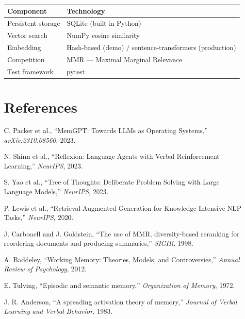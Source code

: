 \documentclass[a4paper,12pt]{article}
\begin{document}
\begin{table}[H]
\centering
\begin{tabular}{ll}
\toprule
\textbf{Component} & \textbf{Technology} \\
\midrule
Persistent storage & SQLite (built-in Python) \\
Vector search      & NumPy cosine similarity \\
Embedding          & Hash-based (demo) / sentence-transformers (production) \\
Competition        & MMR --- Maximal Marginal Relevance \\
Test framework     & pytest \\
\bottomrule
\end{tabular}
\end{table}

\section{References}

\begin{enumerate}[label={[\arabic*]}]
\item C. Packer et al., ``MemGPT: Towards LLMs as Operating Systems,'' \emph{arXiv:2310.08560}, 2023.
\item N. Shinn et al., ``Reflexion: Language Agents with Verbal Reinforcement Learning,'' \emph{NeurIPS}, 2023.
\item S. Yao et al., ``Tree of Thoughts: Deliberate Problem Solving with Large Language Models,'' \emph{NeurIPS}, 2023.
\item P. Lewis et al., ``Retrieval-Augmented Generation for Knowledge-Intensive NLP Tasks,'' \emph{NeurIPS}, 2020.
\item J. Carbonell and J. Goldstein, ``The use of MMR, diversity-based reranking for reordering documents and producing summaries,'' \emph{SIGIR}, 1998.
\item A. Baddeley, ``Working Memory: Theories, Models, and Controversies,'' \emph{Annual Review of Psychology}, 2012.
\item E. Tulving, ``Episodic and semantic memory,'' \emph{Organization of Memory}, 1972.
\item J. R. Anderson, ``A spreading activation theory of memory,'' \emph{Journal of Verbal Learning and Verbal Behavior}, 1983.
\end{enumerate}
\end{document}
